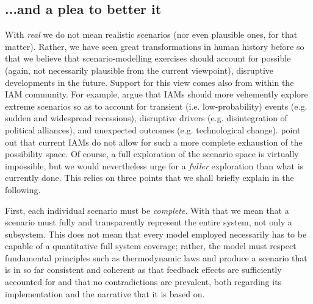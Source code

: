 \documentclass{article}
\begin{document}
\begin{refsection}
\section{...and a plea to better it}

With \textit{real} we do not mean realistic scenarios (nor even plausible ones, for that matter). Rather, we have seen great transformations in human history before \parencite{fischer_2014} so that we believe that scenario-modelling exercises should account for possible (again, not necessarily plausible from the current viewpoint), disruptive developments in the future.\footnotemark{} Support for this view comes also from within the IAM community. For example, \textcite{mccollum_2020} argue that IAMs should more vehemently explore extreme scenarios so as to account for transient (i.e. low-probability) events (e.g. sudden and widespread recessions), disruptive drivers (e.g. disintegration of political alliances), and unexpected outcomes (e.g. technological change). \textcite{gambhir_2022} point out that current IAMs do not allow for such a more complete exhaustion of the possibility space. Of course, a full exploration of the scenario space is virtually impossible, but we would nevertheless urge for a \textit{fuller} exploration than what is currently done. This relies on three points that we shall briefly explain in the following.


First, each individual scenario must be \textit{complete}. With that we mean that a scenario must fully and transparently represent the entire system, not only a subsystem. This does not mean that every model employed necessarily has to be capable of a quantitative full system coverage; rather, the model must respect fundamental principles such as thermodynamic laws and produce a scenario that is in so far consistent and coherent as that feedback effects are sufficiently accounted for and that no contradictions are prevalent, both regarding its implementation and the narrative that it is based on.


\end{refsection}
\end{document}
